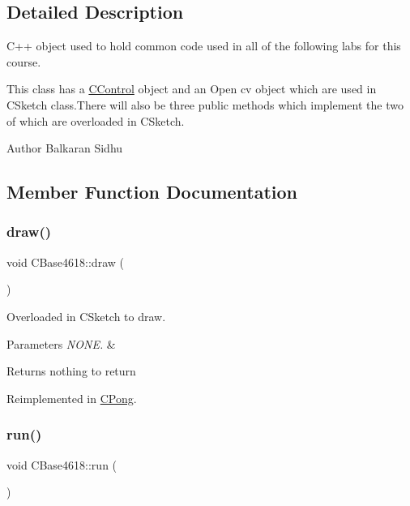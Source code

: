 \subsection{Detailed Description}
C++ object used to hold common code used in all of the following labs for this course. 

This class has a \hyperlink{class_c_control}{C\+Control} object and an Open cv object which are used in C\+Sketch class.\+There will also be three public methods which implement the two of which are overloaded in C\+Sketch.

\begin{DoxyAuthor}{Author}
Balkaran Sidhu 
\end{DoxyAuthor}


\subsection{Member Function Documentation}
\hypertarget{class_c_base4618_a853327d563d064bb31db241861c4d291}{}\label{class_c_base4618_a853327d563d064bb31db241861c4d291} 
\subsubsection{\texorpdfstring{draw()}{draw()}}
{\footnotesize\ttfamily void C\+Base4618\+::draw (\begin{DoxyParamCaption}{ }\end{DoxyParamCaption})\hspace{0.3cm}{\ttfamily [virtual]}}



Overloaded in C\+Sketch to draw. 


\begin{DoxyParams}{Parameters}
{\em N\+O\+N\+E.} & \\
\hline
\end{DoxyParams}
\begin{DoxyReturn}{Returns}
nothing to return 
\end{DoxyReturn}


Reimplemented in \hyperlink{class_c_pong_af43dbb61f1f1addd6920b01aeca3fa63}{C\+Pong}.

\hypertarget{class_c_base4618_a535e816d735d10d6048dd39cd893d393}{}\label{class_c_base4618_a535e816d735d10d6048dd39cd893d393} 
\subsubsection{\texorpdfstring{run()}{run()}}
{\footnotesize\ttfamily void C\+Base4618\+::run (\begin{DoxyParamCaption}{ }\end{DoxyParamCaption})\hspace{0.3cm}{\ttfamily [virtual]}}



